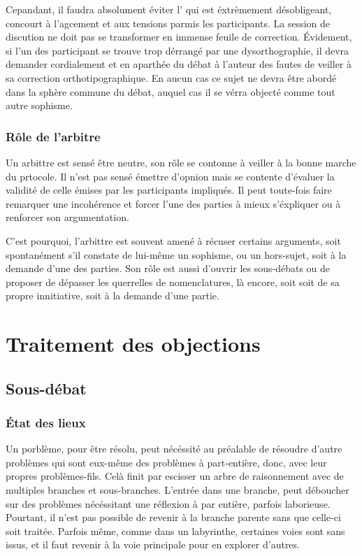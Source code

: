 Cepandant, il faudra absolument éviter l’ qui est éxtrèmement désobligeant, concourt à l’agcement et aux tensions parmis les participants. La session de discution ne doit pas se transformer en immense feuile de correction. Évidement, si l’un des participant se trouve trop dérrangé par une dysorthographie, il devra demander cordialement et en aparthée du débat à l’auteur des fautes de veiller à sa correction orthotipographique. En aucun cas ce sujet ne devra être abordé dans la sphère commune du débat, auquel cas il se vérra objecté comme tout autre sophisme.

\subsubsection{Rôle de l’arbitre}
Un arbittre est sensé être neutre, son rôle se contonne à veiller à la bonne marche du prtocole. Il n’est pas sensé émettre d’opnion mais se contente d’évaluer la validité de celle émises par les participants impliqués. Il peut toute-fois faire remarquer une incohérence et forcer l’une des parties à mieux s’éxpliquer ou à renforcer son argumentation.

C’est pourquoi, l’arbittre est souvent amené à récuser certains arguments, soit spontanément s’il constate de lui-même un sophisme, ou un hors-sujet, soit à la demande d’une des parties.
 Son rôle est aussi d’ouvrir les sous-débats ou de proposer de dépasser les querrelles de nomenclatures, là encore, soit soit de sa propre innitiative, soit à la demande d’une partie.


\section{Traitement des objections}
\subsection{Sous-débat}
\subsubsection{État des lieux}
Un porblème, pour être résolu, peut nécéssité au préalable de résoudre d’autre problèmes qui sont eux-même des problèmes à part-entière, donc, avec leur propres problèmes-fils. Celà finit par escisser un arbre de raisonnement avec de multiples branches et sous-branches. L’entrée dans une branche, peut déboucher sur des problèmes nécéssitant une réflexion à par entière, parfois laborieuse. Pourtant, il n’est pas possible de revenir à la branche parente sans que celle-ci soit traitée. Parfois même, comme dans un labyrinthe, certaines voies sont sans issus, et il faut revenir à la voie principale pour en explorer d’autres.

